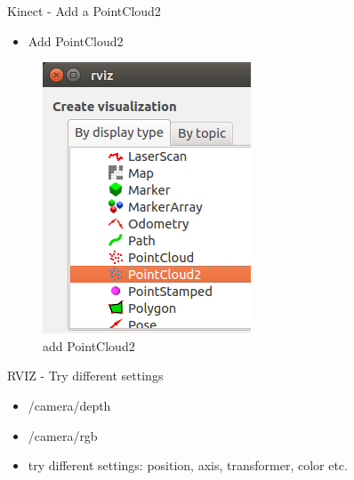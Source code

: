 \documentclass{beamer}
\begin{document}
\begin{frame}{Kinect - Add a PointCloud2}	

\begin{itemize}
	\item Add PointCloud2
\end{itemize}

		\begin{figure}[H]
			\centering
			\includegraphics[scale=0.4]{./images/Add_PointCloud2.png}
			\caption{add PointCloud2}
			\label{fig:ros_add_pointcloud}
		\end{figure}
		
\end{frame}


\begin{frame}{RVIZ - Try different settings}	

	\begin{itemize}
		\item /camera/depth
		\item /camera/rgb
		\item try different settings: position, axis, transformer, color etc.
	\end{itemize}
\end{frame}


\end{document}
